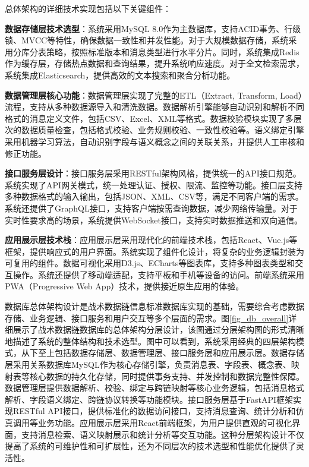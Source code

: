 总体架构的详细技术实现包括以下关键组件：

\textbf{数据存储层技术选型}：系统采用MySQL 8.0作为主数据库，支持ACID事务、行级锁、MVCC等特性，确保数据一致性和并发性能。对于大规模数据存储，系统采用分库分表策略，按照标准版本和消息类型进行水平分片。同时，系统集成Redis作为缓存层，存储热点数据和查询结果，提升系统响应速度。对于全文检索需求，系统集成Elasticsearch，提供高效的文本搜索和聚合分析功能。

\textbf{数据管理层核心功能}：数据管理层实现了完整的ETL（Extract, Transform, Load）流程，支持从多种数据源导入和清洗数据。数据解析引擎能够自动识别和解析不同格式的消息定义文件，包括CSV、Excel、XML等格式。数据校验模块实现了多层次的数据质量检查，包括格式校验、业务规则校验、一致性校验等。语义绑定引擎采用机器学习算法，自动识别字段与语义概念之间的关联关系，并提供人工审核和修正功能。

\textbf{接口服务层设计}：接口服务层采用RESTful架构风格，提供统一的API接口规范。系统实现了API网关模式，统一处理认证、授权、限流、监控等功能。接口层支持多种数据格式的输入输出，包括JSON、XML、CSV等，满足不同客户端的需求。系统还提供了GraphQL接口，支持客户端按需查询数据，减少网络传输量。对于实时性要求高的场景，系统提供WebSocket接口，支持实时数据推送和双向通信。

\textbf{应用展示层技术栈}：应用展示层采用现代化的前端技术栈，包括React、Vue.js等框架，提供响应式的用户界面。系统实现了组件化设计，将复杂的业务逻辑封装为可复用的组件。数据可视化采用D3.js、ECharts等图表库，支持多种图表类型和交互操作。系统还提供了移动端适配，支持平板和手机等设备的访问。前端系统采用PWA（Progressive Web App）技术，提供接近原生应用的体验。

数据库总体架构设计是战术数据链信息标准数据库实现的基础，需要综合考虑数据存储、业务逻辑、接口服务和用户交互等多个层面的需求。图\ref{fig_db_overall}详细展示了战术数据链数据库的总体架构分层设计，该图通过分层架构图的形式清晰地描述了系统的整体结构和技术选型。图中可以看到，系统采用经典的四层架构模式，从下至上包括数据存储层、数据管理层、接口服务层和应用展示层。数据存储层采用关系数据库MySQL作为核心存储引擎，负责消息表、字段表、概念表、映射表等核心数据的持久化存储，同时提供事务支持、并发控制和数据完整性保障。数据管理层提供数据解析、校验、绑定与跨链映射等核心业务逻辑，包括消息格式解析、字段语义绑定、跨链协议转换等功能模块。接口服务层基于FastAPI框架实现RESTful API接口，提供标准化的数据访问接口，支持消息查询、统计分析和仿真调用等业务功能。应用展示层采用React前端框架，为用户提供直观的可视化界面，支持消息检索、语义映射展示和统计分析等交互功能。这种分层架构设计不仅提高了系统的可维护性和可扩展性，还为不同层次的技术选型和性能优化提供了灵活性。


